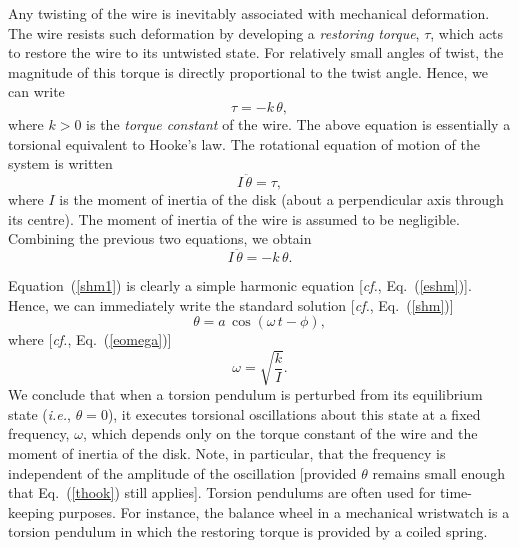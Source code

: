 Any twisting of the wire is inevitably associated with mechanical deformation. The wire resists such deformation by developing
a {\em restoring torque}, $\tau$, which acts to restore the wire to its untwisted state. For relatively small angles
of twist, the magnitude of this torque is directly proportional to the twist angle. Hence, we can write
\begin{equation}\label{thook}
\tau = -k\,\theta,
\end{equation}
where $k>0$ is the {\em torque constant} of the wire. The above equation is essentially a torsional
equivalent to Hooke's law. The rotational equation of motion of the system is
written
\begin{equation}
I\,\ddot{\theta} = \tau,
\end{equation}
where $I$ is the moment of inertia of the disk (about a perpendicular axis through its centre). The moment
of inertia of the wire is assumed to be negligible. Combining the previous two equations, we obtain
\begin{equation}\label{shm1}
I\,\ddot{\theta} = - k\,\theta.
\end{equation} 

Equation~(\ref{shm1}) is clearly a simple harmonic equation [{\em cf.}, Eq.~(\ref{eshm})]. Hence,
we can immediately write the standard solution [{\em cf.}, Eq.~(\ref{shm})]
\begin{equation}
\theta = a\,\cos(\omega\,t -\phi),
\end{equation}
where [{\em cf.}, Eq.~(\ref{eomega})]
\begin{equation}
\omega  =\sqrt{\frac{k}{I}}.
\end{equation}
We conclude that when a torsion pendulum is perturbed from its equilibrium state ({\em i.e.}, $\theta=0$),
it executes torsional oscillations about this state at a fixed frequency, $\omega$, which
depends only on the torque constant of the wire and the moment of inertia of the disk. Note,
in particular, that the frequency is independent of the amplitude of the oscillation [provided $\theta$
remains small enough that Eq.~(\ref{thook}) still applies]. Torsion pendulums are often
used for time-keeping purposes. For instance, the balance wheel in a mechanical wristwatch is a torsion
pendulum in which the restoring torque is provided by a coiled spring.

